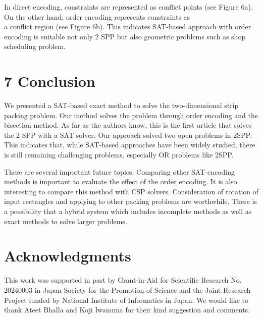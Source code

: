 \documentclass[10pt]{article}
\begin{document}
In direct encoding, constraints are represented as conflict points (see Figure 6a). On the other hand, order encoding represents constraints as\\
a conflict region (see Figure 6b). This indicates SAT-based approach with order encoding is suitable not only 2 SPP but also geometric problems such as shop scheduling problem.

\section*{7 Conclusion}
We presented a SAT-based exact method to solve the two-dimensional strip packing problem. Our method solves the problem through order encoding and the bisection method. As far as the authors know, this is the first article that solves the 2 SPP with a SAT solver. Our approach solved two open problems in 2SPP. This indicates that, while SAT-based approaches have been widely studied, there is still remaining challenging problems, especially OR problems like 2SPP.

There are several important future topics. Comparing other SAT-encoding methods is important to evaluate the effect of the order encoding. It is also interesting to compare this method with CSP solvers. Consideration of rotation of input rectangles and applying to other packing problems are worthwhile. There is a possibility that a hybrid system which includes incomplete methods as well as exact methods to solve larger problems.

\section*{Acknowledgments}
This work was supported in part by Grant-in-Aid for Scientific Research No. 20240003 in Japan Society for the Promotion of Science and the Joint Research Project funded by National Institute of Informatics in Japan. We would like to thank Ateet Bhalla and Koji Iwanuma for their kind suggestion and comments.
\end{document}
